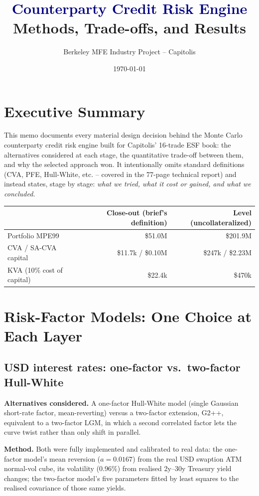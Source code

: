 \documentclass[10pt,letterpaper]{article}
\title{\textcolor{navy}{\textbf{Counterparty Credit Risk Engine}}\\[4pt]
\Large Methods, Trade-offs, and Results}
\author{Berkeley MFE Industry Project -- Capitolis}
\date{\today}
\begin{document}
\maketitle
\thispagestyle{fancy}

\section*{Executive Summary}
This memo documents every material design decision behind the Monte Carlo counterparty credit risk engine built for Capitolis' 16-trade ESF book: the alternatives considered at each stage, the quantitative trade-off between them, and why the selected approach won. It intentionally omits standard definitions (CVA, PFE, Hull-White, etc. -- covered in the 77-page technical report) and instead states, stage by stage: \emph{what we tried, what it cost or gained, and what we concluded.}

\begin{center}
\small
\begin{tabular}{lrr}
\toprule
& \textbf{Close-out (brief's definition)} & \textbf{Level (uncollateralized)} \\
\midrule
Portfolio MPE99 & \$51.0M & \$201.9M \\
CVA / SA-CVA capital & \$11.7k / \$0.10M & \$247k / \$2.23M \\
KVA (10\% cost of capital) & \$22.4k & \$470k \\
\bottomrule
\end{tabular}
\end{center}

\section{Risk-Factor Models: One Choice at Each Layer}

\subsection{USD interest rates: one-factor vs.\ two-factor Hull-White}
\textbf{Alternatives considered.} A one-factor Hull-White model (single Gaussian short-rate factor, mean-reverting) versus a two-factor extension, G2++, equivalent to a two-factor LGM, in which a second correlated factor lets the curve twist rather than only shift in parallel.

\textbf{Method.} Both were fully implemented and calibrated to real data: the one-factor model's mean reversion ($a=0.0167$) from the real USD swaption ATM normal-vol cube, its volatility (0.96\%) from realised 2y--30y Treasury yield changes; the two-factor model's five parameters fitted by least squares to the realised covariance of those same yields.
\end{document}
